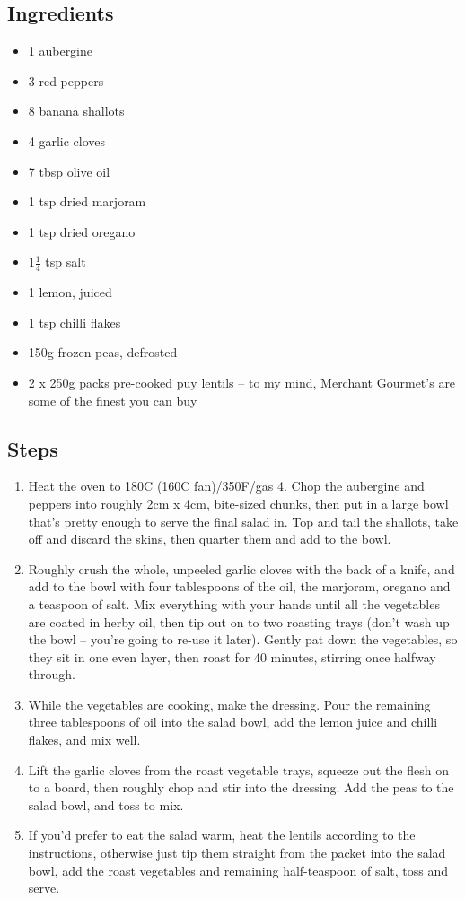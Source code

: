 \documentclass{book}
\begin{document}
\subsection*{Ingredients}
\begin{itemize}
\item 1 aubergine
\item 3 red peppers
\item 8 banana shallots
\item 4 garlic cloves 
\item 7 tbsp olive oil
\item 1 tsp dried marjoram
\item 1 tsp dried oregano
\item 1$\frac{1}{4}$ tsp salt
\item 1 lemon, juiced
\item 1 tsp chilli flakes
\item 150g frozen peas, defrosted
\item 2 x 250g packs pre-cooked puy lentils – to my mind, Merchant Gourmet’s are some of the finest you can buy
\end{itemize}

\subsection*{Steps}
\begin{enumerate}
\item Heat the oven to 180C (160C fan)/350F/gas 4. Chop the aubergine and peppers into roughly 2cm x 4cm, bite-sized chunks, then put in a large bowl that’s pretty enough to serve the final salad in. Top and tail the shallots, take off and discard the skins, then quarter them and add to the bowl. 
\item Roughly crush the whole, unpeeled garlic cloves with the back of a knife, and add to the bowl with four tablespoons of the oil, the marjoram, oregano and a teaspoon of salt. Mix everything with your hands until all the vegetables are coated in herby oil, then tip out on to two roasting trays (don’t wash up the bowl – you’re going to re-use it later). Gently pat down the vegetables, so they sit in one even layer, then roast for 40 minutes, stirring once halfway through.
\item While the vegetables are cooking, make the dressing. Pour the remaining three tablespoons of oil into the salad bowl, add the lemon juice and chilli flakes, and mix well.
\item Lift the garlic cloves from the roast vegetable trays, squeeze out the flesh on to a board, then roughly chop and stir into the dressing. Add the peas to the salad bowl, and toss to mix.
\item If you’d prefer to eat the salad warm, heat the lentils according to the instructions, otherwise just tip them straight from the packet into the salad bowl, add the roast vegetables and remaining half-teaspoon of salt, toss and serve.
\end{enumerate}
\newpage
\end{document}
